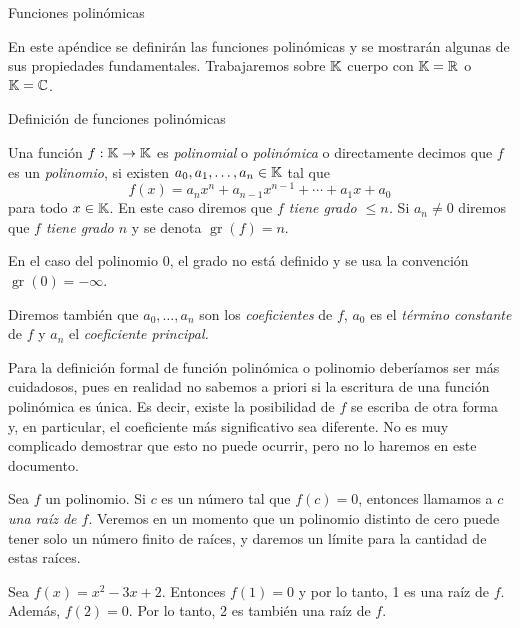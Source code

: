 \begin{chapter}{Funciones polinómicas}

 En este apéndice se definirán las funciones polinómicas y se mostrarán algunas de sus propiedades fundamentales. Trabajaremos sobre $\mathbb K$  cuerpo con $\mathbb K=\mathbb R$ o $\mathbb K=\mathbb C$.

 \begin{section}{Definición de funciones polinómicas}\label{seccion-definicion-polinomios}


  \begin{definicion}
      Una función $f: \mathbb K \to \mathbb K$ es \textit{polinomial} o \textit{polinómica} o directamente decimos que $f$  es  un \textit{polinomio}, si existen $a_0,a_1,\ldots,a_n \in \mathbb K$ tal que
      \begin{equation}\label{eq-funcion-polinomica}
          f(x) = a_nx^n + a_{n-1}x^{n-1}+\cdots + a_1x +a_0
      \end{equation}
      para todo $x \in \mathbb K$. En este caso  diremos que  \textit{$f$ tiene grado $\le n$.} Si $a_n \ne 0$ diremos que \textit{$f$ tiene grado $n$} y  se denota $\operatorname{gr}(f)=n$.

      En  el caso del polinomio $0$, el grado no está definido y se usa la convención $\operatorname{gr}(0)=-\infty$.

      Diremos también que  $a_0,\ldots,a_n$ son los \textit{coeficientes} de $f$, $a_0$ es el \textit{término constante} de $f$ y $a_n$  el \textit{coeficiente principal.}
  \end{definicion}

  \begin{obs}
      Para la definición formal de función polinómica o polinomio deberíamos ser más cuidadosos, pues en realidad no sabemos a priori si la escritura de una función polinómica es única. Es  decir,  existe la posibilidad de $f$  se escriba de otra forma y,  en particular, el coeficiente más significativo sea diferente. No es muy complicado demostrar que esto no puede ocurrir, pero no lo haremos en este documento.
  \end{obs}


  Sea $f$ un polinomio. Si $c$ es un número tal que $f (c) = 0$, entonces llamamos a \textit{$c$ una raíz de $f$}. Veremos en un momento que un polinomio distinto de cero puede tener solo un número finito de raíces, y daremos un límite para la cantidad de estas raíces.

  \begin{ejemplo*}
      Sea $f (x) = x^2 - 3x + 2$. Entonces $f(1)=0$ y por lo tanto, 1 es una raíz de $f$.
      Además, $f (2) = 0$. Por lo tanto, 2 es también una raíz de $f$.
  \end{ejemplo*}


\end{section}
\end{chapter}
